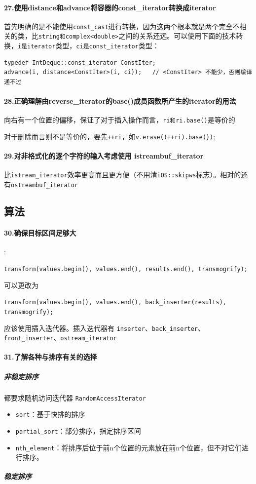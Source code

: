 \documentclass[UTF8,a4paper,12pt]{ctexbook}
\begin{document}
			\paragraph{27.使用distance和advance将容器的const\_iterator转换成iterator} 首先明确的是不能使用\verb|const_cast|进行转换，因为这两个根本就是两个完全不相关的类，比\verb|string和complex<double>|之间的关系还远。可以使用下面的技术转换，\verb|i是iterator|类型，\verb|ci是const_iterator|类型：
			
				\begin{lstlisting}
typedef IntDeque::const_iterator ConstIter;
advance(i, distance<ConstIter>(i, ci));   // <ConstIter> 不能少，否则编译通不过
				\end{lstlisting}
			\paragraph{28.正确理解由reverse\_iterator的base()成员函数所产生的iterator的用法} 向右有一个位置的偏移，保证了对于插入操作而言，\verb|ri和ri.base()|是等价的
			
			对于删除而言则不是等价的，要先\verb|++ri|，如\verb|v.erase((++ri).base())|;	
			\paragraph{29.对非格式化的逐个字符的输入考虑使用 istreambuf\_iterator} 比\verb|istream_iterator|效率更高而且更方便（不用清\verb|iOS::skipws|标志）。相对的还有\verb|ostreambuf_iterator|
		\subsection{算法}
			\paragraph{30.确保目标区间足够大}:
			
			\verb|transform(values.begin(), values.end(), results.end(), transmogrify); |
			
			可以更改为
			
			\verb|transform(values.begin(), values.end(), back_inserter(results), transmogrify);|
			
			应该使用插入迭代器。插入迭代器有 \verb|inserter|、\verb|back_inserter|、\verb|front_inserter|、\verb|ostream_iterator|
			\paragraph{31.了解各种与排序有关的选择}
				\subparagraph{非稳定排序}都要求随机访问迭代器 \verb|RandomAccessIterator| 
					\begin{itemize}[itemindent = 1em]
						\item \verb|sort|：基于快排的排序
						\item \verb|partial_sort|：部分排序，指定排序区间
						\item \verb|nth_element|：将排序后位于前n个位置的元素放在前n个位置，但不对它们进行排序。
					\end{itemize}
				\subparagraph{稳定排序}
				
\end{document}
